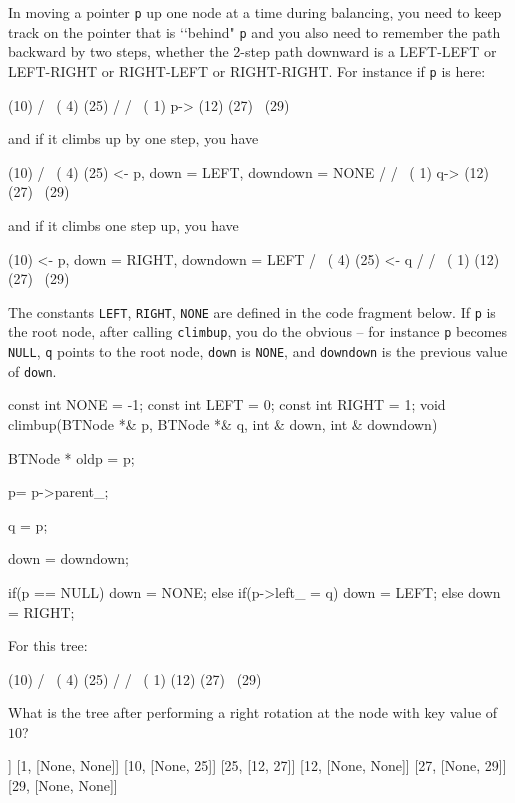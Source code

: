 \nextq
In moving a pointer \verb!p! up one node at a time during
balancing, you need to keep track on the pointer that is \lq\lq behind"
\verb!p! and you also need to remember the path backward by two steps, whether
the 2-step path downward is a
LEFT-LEFT or LEFT-RIGHT or RIGHT-LEFT or RIGHT-RIGHT.
For instance if \verb!p! is here:
\begin{console}[fontsize=\footnotesize]
            (10)
          /      \
      ( 4)        (25)
     /           /    \
 ( 1)    p-> (12)      (27)
                           \
                            (29)
\end{console}
and if it climbs up by one step, you have
\begin{console}[fontsize=\footnotesize]
            (10)
          /      \
      ( 4)        (25) <- p, down = LEFT, downdown = NONE
     /           /    \
 ( 1)     q-> (12)      (27)
                           \
                            (29)
\end{console}
and if it climbs one step up, you have
\begin{console}[fontsize=\footnotesize]
            (10) <- p, down = RIGHT, downdown = LEFT
          /      \
      ( 4)        (25) <- q
     /           /    \
 ( 1)        (12)      (27)
                           \
                            (29)

\end{console}
The constants \verb!LEFT!, \verb!RIGHT!, \verb!NONE! are defined in the code
fragment below.
If \verb!p! is the root node, after calling \verb!climbup!,
you do the obvious -- for instance
\verb!p! becomes \verb!NULL!, \verb!q! points to the root node,
\verb!down! is \verb!NONE!, and \verb!downdown! is the previous value of
\verb!down!.
\\
\ANSWER
\begin{answercode}
const int NONE = -1;
const int LEFT = 0;
const int RIGHT = 1;
void climbup(BTNode *& p, BTNode *& q, int & down, int & downdown)
{
  BTNode * oldp = p;

  p= p->parent_;

  q = p;

  down = downdown;

  if(p == NULL)
  {
    down = NONE;
  }
  else if(p->left_ = q)
  {
    down = LEFT;
  }
  else
  {
    down = RIGHT;
  }
}
\end{answercode}

\nextq
For this tree:
\begin{console}[fontsize=\footnotesize]
            (10)
          /      \
      ( 4)        (25)
     /           /    \
 ( 1)        (12)      (27)
                           \
                            (29)
\end{console}
What is the tree after performing a right rotation at the node
with key value of $10$?
\\
\ANSWER
\begin{answercode}
[4, [1, 10]]
[1, [None, None]]
[10, [None, 25]]
[25, [12, 27]]
[12, [None, None]]
[27, [None, 29]]
[29, [None, None]]
\end{answercode}

